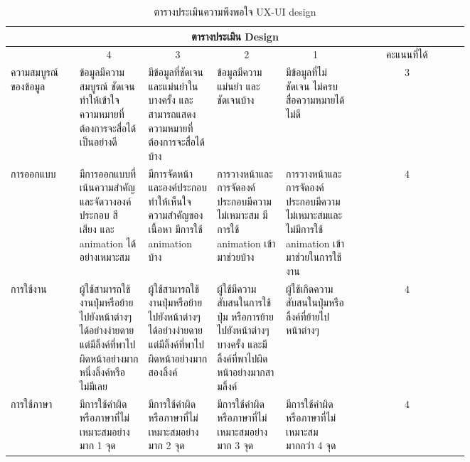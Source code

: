 \begin{table}[H]
\caption{ตารางประเมินความพึงพอใจ UX-UI design}\label{tbl:uxuieva}
\begin{tabular}{|p{0.15\linewidth}|p{0.15\linewidth}|p{0.15\linewidth}|p{0.15\linewidth}|p{0.15\linewidth}|c|}
\hline
\multicolumn{6}{|c|}{ตารางประเมิน Design}                                                                                                                                                            \\ \hline

                     & \multicolumn{1}{c|}{4}                                                                                                 & \multicolumn{1}{c|}{3}                                                                                   & \multicolumn{1}{c|}{2}                                                                                        & \multicolumn{1}{c|}{1}                                                                        & คะแนนที่ได้ \\ \hline
ความสมบูรณ์ของข้อมูล    & ข้อมูลมีความสมบูรณ์   ชัดเจนทำให้เข้าใจความหมายที่ต้องการจะสื่อได้เป็นอย่างดี                                          & มีข้อมูลที่ชัดเจน   และแม่นยำในบางครั้ง และสามารถแสดงความหมายที่ต้องการจะสื่อได้บ้าง                     & ข้อมูลมีความแม่นยำ   และชัดเจนบ้าง                                                                            & มีข้อมูลที่ไม่ชัดเจน   ไม่ครบ สื่อความหมายได้ไม่ดี                                            & 3           \\ \hline
การออกแบบ            & มีการออกแบบที่เน้นความสำคัญและจัดวางองค์ประกอบ   สี เสียง และ animation ได้อย่างเหมาะสม                                & มีการจัดหน้า   และองค์ประกอบทำให้เห็นใจความสำคัญของเนื้อหา มีการใช้ animation   บ้าง                     & การวางหน้าและการจัดองค์ประกอบมีความไม่เหมาะสม   มีการใช้ animation เข้ามาช่วยบ้าง                             & การวางหน้าและการจัดองค์ประกอบมีความไม่เหมาะสมและไม่มีการใช้   animation เข้ามาช่วยในการใช้งาน & 4           \\ \hline
การใช้งาน              & ผู้ใช้สามารถใช้งานปุ่มหรือย้ายไปยังหน้าต่างๆได้อย่างง่ายดาย   แต่มีลิ้งค์ที่พาไปผิดหน้าอย่างมากหนึ่งลิ้งค์หรือไม่มีเลย & ผู้ใช้สามารถใช้งานปุ่มหรือย้ายไปยังหน้าต่างๆได้อย่างง่ายดาย   แต่มีลิ้งค์ที่พาไปผิดหน้าอย่างมากสองลิ้งค์ & ผู้ใช้มีความสับสนในการใช้ปุ่ม   หรือการย้ายไปยังหน้าต่างๆ บางครั้ง และมีลิ้งค์ที่พาไปผิดหน้าอย่างมากสามลิ้งค์ & ผู้ใช้เกิดความสับสนในปุ่มหรือลิ้งค์ที่ย้ายไปหน้าต่างๆ                                         & 4           \\ \hline
การใช้ภาษา            & มีการใช้คำผิดหรือภาษาที่ไม่เหมาะสมอย่างมาก   1 จุด                                                                     & มีการใช้คำผิดหรือภาษาที่ไม่เหมาะสมอย่างมาก   2 จุด                                                       & มีการใช้คำผิดหรือภาษาที่ไม่เหมาะสมอย่างมาก 3 จุด                                                              & มีการใช้คำผิดหรือภาษาที่ไม่เหมาะสมมากกว่า 4 จุด                                               & 4           \\ \hline
\end{tabular}
\end{table}

